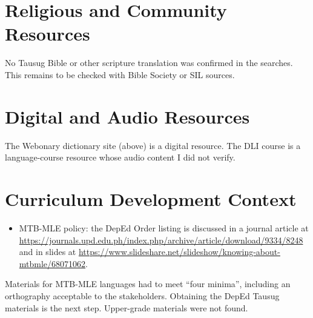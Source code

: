 \documentclass[12pt]{article}
\begin{document}
\section{Religious and Community Resources}
No Tausug Bible or other scripture translation was confirmed in the searches. This remains to be checked with Bible Society or SIL sources.

\section{Digital and Audio Resources}
The Webonary dictionary site (above) is a digital resource. The DLI course is a language-course resource whose audio content I did not verify.

\section{Curriculum Development Context}
\begin{itemize}
\item MTB-MLE policy: the DepEd Order listing is discussed in a journal article at \url{https://journals.upd.edu.ph/index.php/archive/article/download/9334/8248} and in slides at \url{https://www.slideshare.net/slideshow/knowing-about-mtbmle/68071062}.
\end{itemize}
Materials for MTB-MLE languages had to meet ``four minima'', including an orthography acceptable to the stakeholders. Obtaining the DepEd Tausug materials is the next step. Upper-grade materials were not found.
\end{document}
